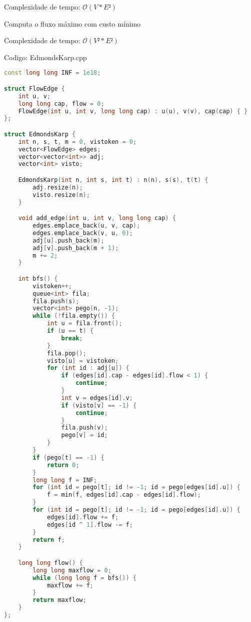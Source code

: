\documentclass[10pt, a4paper, oneside]{book}
\begin{document}
Complexidade de tempo: $\mathcal{O}(V * E²)$



\textbf{} 


Computa o fluxo máximo com custo mínimo



Complexidade de tempo: $\mathcal{O}(V² * E²)$

\hfill

Codigo: EdmondsKarp.cpp

\begin{lstlisting}[language=C++]
const long long INF = 1e18;

struct FlowEdge {
    int u, v;
    long long cap, flow = 0;
    FlowEdge(int u, int v, long long cap) : u(u), v(v), cap(cap) { }
};

struct EdmondsKarp {
    int n, s, t, m = 0, vistoken = 0;
    vector<FlowEdge> edges;
    vector<vector<int>> adj;
    vector<int> visto;

    EdmondsKarp(int n, int s, int t) : n(n), s(s), t(t) {
        adj.resize(n);
        visto.resize(n);
    }

    void add_edge(int u, int v, long long cap) {
        edges.emplace_back(u, v, cap);
        edges.emplace_back(v, u, 0);
        adj[u].push_back(m);
        adj[v].push_back(m + 1);
        m += 2;
    }

    int bfs() {
        vistoken++;
        queue<int> fila;
        fila.push(s);
        vector<int> pego(n, -1);
        while (!fila.empty()) {
            int u = fila.front();
            if (u == t) {
                break;
            }
            fila.pop();
            visto[u] = vistoken;
            for (int id : adj[u]) {
                if (edges[id].cap - edges[id].flow < 1) {
                    continue;
                }
                int v = edges[id].v;
                if (visto[v] == -1) {
                    continue;
                }
                fila.push(v);
                pego[v] = id;
            }
        }
        if (pego[t] == -1) {
            return 0;
        }
        long long f = INF;
        for (int id = pego[t]; id != -1; id = pego[edges[id].u]) {
            f = min(f, edges[id].cap - edges[id].flow);
        }
        for (int id = pego[t]; id != -1; id = pego[edges[id].u]) {
            edges[id].flow += f;
            edges[id ^ 1].flow -= f;
        }
        return f;
    }

    long long flow() {
        long long maxflow = 0;
        while (long long f = bfs()) {
            maxflow += f;
        }
        return maxflow;
    }
};
\end{lstlisting}
\hfill
\end{document}
